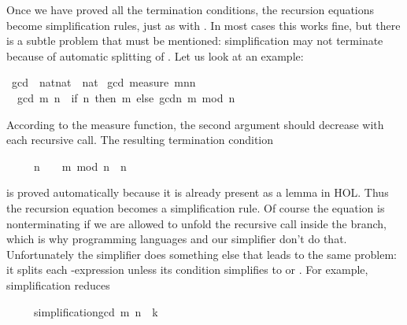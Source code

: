 %
\begin{isabellebody}%
\def\isabellecontext{simplification}%
%
\isadelimtheory
%
\endisadelimtheory
%
\isatagtheory
%
\endisatagtheory
{\isafoldtheory}%
%
\isadelimtheory
%
\endisadelimtheory
%
\begin{isamarkuptext}%
Once we have proved all the termination conditions, the  
recursion equations become simplification rules, just as with
. In most cases this works fine, but there is a subtle
problem that must be mentioned: simplification may not
terminate because of automatic splitting of .
Let us look at an example:%
\end{isamarkuptext}%
\isamarkuptrue%
\isamarkupfalse%
\ gcd\ {\isacharcolon}{\isacharcolon}\ {\isachardoublequoteopen}nat{\isasymtimes}nat\ {\isasymRightarrow}\ nat{\isachardoublequoteclose}\isanewline
{}\isamarkupfalse%
\ gcd\ {\isachardoublequoteopen}measure\ {\isacharparenleft}{\isasymlambda}{\isacharparenleft}m{\isacharcomma}n{\isacharparenright}{\isachardot}n{\isacharparenright}{\isachardoublequoteclose}\isanewline
\ \ {\isachardoublequoteopen}gcd\ {\isacharparenleft}m{\isacharcomma}\ n{\isacharparenright}\ {\isacharequal}\ {\isacharparenleft}if\ n{\isacharequal}{}\ then\ m\ else\ gcd{\isacharparenleft}n{\isacharcomma}\ m\ mod\ n{\isacharparenright}{\isacharparenright}{\isachardoublequoteclose}%
\begin{isamarkuptext}%
\noindent
According to the measure function, the second argument should decrease with
each recursive call. The resulting termination condition
\begin{isabelle}%
\ \ \ \ \ n\ {\isasymnoteq}\ {}\ {\isasymLongrightarrow}\ m\ mod\ n\ {\isacharless}\ n%
\end{isabelle}
is proved automatically because it is already present as a lemma in
HOL\@.  Thus the recursion equation becomes a simplification
rule. Of course the equation is nonterminating if we are allowed to unfold
the recursive call inside the  branch, which is why programming
languages and our simplifier don't do that. Unfortunately the simplifier does
something else that leads to the same problem: it splits 
each -expression unless its
condition simplifies to  or .  For
example, simplification reduces
\begin{isabelle}%
\ \ \ \ \ simplification{\isachardot}gcd\ {\isacharparenleft}m{\isacharcomma}\ n{\isacharparenright}\ {\isacharequal}\ k%

\end{isabelle}
\end{isamarkuptext}
\end{isabellebody}
